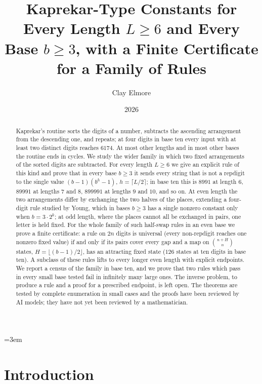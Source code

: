 \documentclass[11pt,letterpaper]{article}
\title{Kaprekar-Type Constants for Every Length \(L \geq 6\) and Every Base \(b \geq 3\), with a Finite Certificate for a Family of Rules}
\author{Clay Elmore}
\date{2026}
\theoremstyle{paperstyle}
\theoremstyle{paperstyledef}
\theoremstyle{paperstylerem}
\begin{document}
\emergencystretch=3em
\maketitle

\begin{abstract}
Kaprekar's routine sorts the digits of a number, subtracts the ascending arrangement from the descending one, and repeats; at four digits in base ten every input with at least two distinct digits reaches \(6174\). At most other lengths and in most other bases the routine ends in cycles. We study the wider family in which two fixed arrangements of the sorted digits are subtracted. For every length \(L \geq 6\) we give an explicit rule of this kind and prove that in every base \(b \geq 3\) it sends every string that is not a repdigit to the single value \((b-1)(b^h - 1)\), \(h = \lceil L/2 \rceil\); in base ten this is \(8991\) at length \(6\), \(89991\) at lengths \(7\) and \(8\), \(899991\) at lengths \(9\) and \(10\), and so on. At even length the two arrangements differ by exchanging the two halves of the places, extending a four-digit rule studied by Young, which in bases \(b \geq 3\) has a single nonzero constant only when \(b = 3 \cdot 2^k\); at odd length, where the places cannot all be exchanged in pairs, one letter is held fixed. For the whole family of such half-swap rules in an even base we prove a finite certificate: a rule on \(2n\) digits is universal (every non-repdigit reaches one nonzero fixed value) if and only if its pairs cover every gap and a map on \(\binom{n+H}{n}\) states, \(H = \lfloor (b-1)/2 \rfloor\), has an attracting fixed state (\(126\) states at ten digits in base ten). A subclass of these rules lifts to every longer even length with explicit endpoints. We report a census of the family in base ten, and we prove that two rules which pass in every small base tested fail in infinitely many large ones. The inverse problem, to produce a rule and a proof for a prescribed endpoint, is left open. The theorems are tested by complete enumeration in small cases and the proofs have been reviewed by AI models; they have not yet been reviewed by a mathematician.
\end{abstract}

\section{Introduction}\label{introduction}
\end{document}
